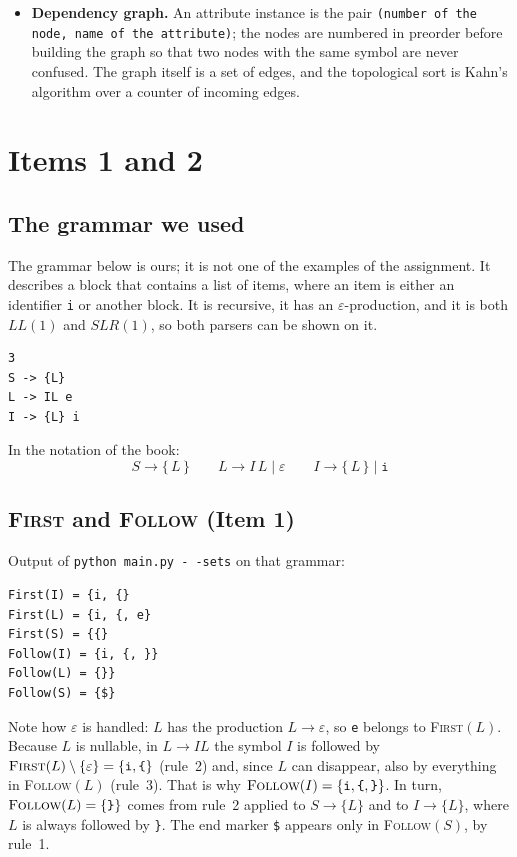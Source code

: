 \documentclass[11pt]{article}
\newcommand{\first}{\textsc{First}}
\newcommand{\follow}{\textsc{Follow}}
\begin{document}
\begin{itemize}
  \item \textbf{Dependency graph.} An attribute instance is the pair
        \texttt{(number of the node, name of the attribute)}; the nodes are numbered in
        preorder before building the graph so that two nodes with the same symbol are
        never confused. The graph itself is a set of edges, and the topological sort is
        Kahn's algorithm over a counter of incoming edges.
\end{itemize}

\section{Items 1 and 2}

\subsection{The grammar we used}

The grammar below is ours; it is not one of the examples of the assignment. It describes
a block that contains a list of items, where an item is either an identifier
\texttt{i} or another block. It is recursive, it has an $\varepsilon$-production, and it
is both $LL(1)$ and $SLR(1)$, so both parsers can be shown on it.

\begin{center}
\small
\begin{verbatim}
3
S -> {L}
L -> IL e
I -> {L} i
\end{verbatim}
\end{center}

In the notation of the book:
\[
S \rightarrow \texttt{\{}\,L\,\texttt{\}}
\qquad
L \rightarrow I\,L \mid \varepsilon
\qquad
I \rightarrow \texttt{\{}\,L\,\texttt{\}} \mid \texttt{i}
\]

\subsection{\first{} and \follow{} (Item 1)}

Output of \texttt{python main.py -\,-sets} on that grammar:

\begin{center}
\small
\begin{verbatim}
First(I) = {i, {}
First(L) = {i, {, e}
First(S) = {{}
Follow(I) = {i, {, }}
Follow(L) = {}}
Follow(S) = {$}
\end{verbatim}
\end{center}

Note how $\varepsilon$ is handled: $L$ has the production $L \rightarrow \varepsilon$, so
\texttt{e} belongs to \first{}$(L)$. Because $L$ is nullable, in $L \rightarrow IL$ the
symbol $I$ is followed by $\first{}(L)\setminus\{\varepsilon\}=\{\texttt{i},\texttt{\{}\}$
(rule~2) and, since $L$ can disappear, also by everything in \follow{}$(L)$ (rule~3). That
is why $\follow{}(I)=\{\texttt{i},\texttt{\{},\texttt{\}}\}$. In turn,
$\follow{}(L)=\{\texttt{\}}\}$ comes from rule~2 applied to $S \rightarrow \texttt{\{}L\texttt{\}}$
and to $I \rightarrow \texttt{\{}L\texttt{\}}$, where $L$ is always followed by \texttt{\}}.
The end marker \texttt{\$} appears only in \follow{}$(S)$, by rule~1.
\end{document}
